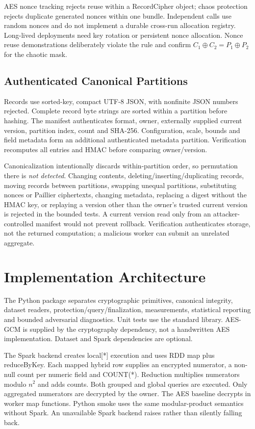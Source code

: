\documentclass[conference]{IEEEtran}
\begin{document}
AES nonce tracking rejects reuse within a RecordCipher object; chaos protection rejects duplicate generated nonces within one bundle. Independent calls use random nonces and do not implement a durable cross-run allocation registry. Long-lived deployments need key rotation or persistent nonce allocation. Nonce reuse demonstrations deliberately violate the rule and confirm $C_1\oplus C_2=P_1\oplus P_2$ for the chaotic mask.

\subsection{Authenticated Canonical Partitions}
Records use sorted-key, compact UTF-8 JSON, with nonfinite JSON numbers rejected. Complete record byte strings are sorted within a partition before hashing. The manifest authenticates format, owner, externally supplied current version, partition index, count and SHA-256. Configuration, scale, bounds and field metadata form an additional authenticated metadata partition. Verification recomputes all entries and HMAC before comparing owner/version.

Canonicalization intentionally discards within-partition order, so permutation there is \emph{not detected}. Changing contents, deleting/inserting/duplicating records, moving records between partitions, swapping unequal partitions, substituting nonces or Paillier ciphertexts, changing metadata, replacing a digest without the HMAC key, or replaying a version other than the owner's trusted current version is rejected in the bounded tests. A current version read only from an attacker-controlled manifest would not prevent rollback. Verification authenticates storage, not the returned computation; a malicious worker can submit an unrelated aggregate.

\section{Implementation Architecture}
The Python package separates cryptographic primitives, canonical integrity, dataset readers, protection/query/finalization, measurements, statistical reporting and bounded adversarial diagnostics. Unit tests use the standard library. AES-GCM is supplied by the cryptography dependency, not a handwritten AES implementation. Dataset and Spark dependencies are optional.

The Spark backend creates local[*] execution and uses RDD map plus reduceByKey. Each mapped hybrid row supplies an encrypted numerator, a non-null count per numeric field and COUNT(*). Reduction multiplies numerators modulo $n^2$ and adds counts. Both grouped and global queries are executed. Only aggregated numerators are decrypted by the owner. The AES baseline decrypts in worker map functions. Python smoke uses the same modular-product semantics without Spark. An unavailable Spark backend raises rather than silently falling back.
\end{document}
